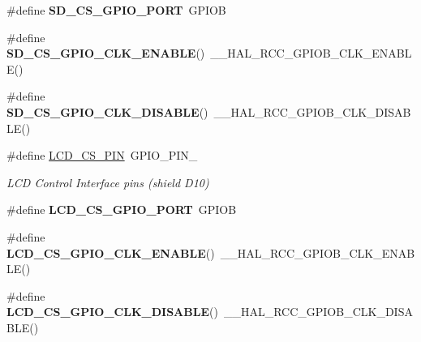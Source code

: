 \begin{DoxyCompactItemize}
\#define {\bfseries S\+D\+\_\+\+C\+S\+\_\+\+G\+P\+I\+O\+\_\+\+P\+O\+RT}~G\+P\+I\+OB
\item 
\mbox{\label{group___s_t_m32_f0_x_x___n_u_c_l_e_o___b_u_s_ga73c725e1bbcc25c80a8041e55bef1df9}} 
\#define {\bfseries S\+D\+\_\+\+C\+S\+\_\+\+G\+P\+I\+O\+\_\+\+C\+L\+K\+\_\+\+E\+N\+A\+B\+LE}()~\+\_\+\+\_\+\+H\+A\+L\+\_\+\+R\+C\+C\+\_\+\+G\+P\+I\+O\+B\+\_\+\+C\+L\+K\+\_\+\+E\+N\+A\+B\+LE()
\item 
\mbox{\label{group___s_t_m32_f0_x_x___n_u_c_l_e_o___b_u_s_gaa13c273e7bb38c7170188d62f930acb4}} 
\#define {\bfseries S\+D\+\_\+\+C\+S\+\_\+\+G\+P\+I\+O\+\_\+\+C\+L\+K\+\_\+\+D\+I\+S\+A\+B\+LE}()~\+\_\+\+\_\+\+H\+A\+L\+\_\+\+R\+C\+C\+\_\+\+G\+P\+I\+O\+B\+\_\+\+C\+L\+K\+\_\+\+D\+I\+S\+A\+B\+LE()
\item 
\mbox{\label{group___s_t_m32_f0_x_x___n_u_c_l_e_o___b_u_s_ga50d72083b1ed4dd0bc2eaabb4a0332c8}} 
\#define \hyperlink{group___s_t_m32_f0_x_x___n_u_c_l_e_o___b_u_s_ga50d72083b1ed4dd0bc2eaabb4a0332c8}{L\+C\+D\+\_\+\+C\+S\+\_\+\+P\+IN}~G\+P\+I\+O\+\_\+\+P\+I\+N\+\_
\begin{DoxyCompactList}\small\item\em L\+CD Control Interface pins (shield D10) \end{DoxyCompactList}\item 
\mbox{\label{group___s_t_m32_f0_x_x___n_u_c_l_e_o___b_u_s_gacd6d9762c06baa185975179e4f6135d6}} 
\#define {\bfseries L\+C\+D\+\_\+\+C\+S\+\_\+\+G\+P\+I\+O\+\_\+\+P\+O\+RT}~G\+P\+I\+OB
\item 
\mbox{\label{group___s_t_m32_f0_x_x___n_u_c_l_e_o___b_u_s_ga2922d914871dde4fcfa2e49b06ccdb6a}} 
\#define {\bfseries L\+C\+D\+\_\+\+C\+S\+\_\+\+G\+P\+I\+O\+\_\+\+C\+L\+K\+\_\+\+E\+N\+A\+B\+LE}()~\+\_\+\+\_\+\+H\+A\+L\+\_\+\+R\+C\+C\+\_\+\+G\+P\+I\+O\+B\+\_\+\+C\+L\+K\+\_\+\+E\+N\+A\+B\+LE()
\item 
\mbox{\label{group___s_t_m32_f0_x_x___n_u_c_l_e_o___b_u_s_ga3e384a136a0b7002120d8670671f8122}} 
\#define {\bfseries L\+C\+D\+\_\+\+C\+S\+\_\+\+G\+P\+I\+O\+\_\+\+C\+L\+K\+\_\+\+D\+I\+S\+A\+B\+LE}()~\+\_\+\+\_\+\+H\+A\+L\+\_\+\+R\+C\+C\+\_\+\+G\+P\+I\+O\+B\+\_\+\+C\+L\+K\+\_\+\+D\+I\+S\+A\+B\+LE()

\end{DoxyCompactItemize}
